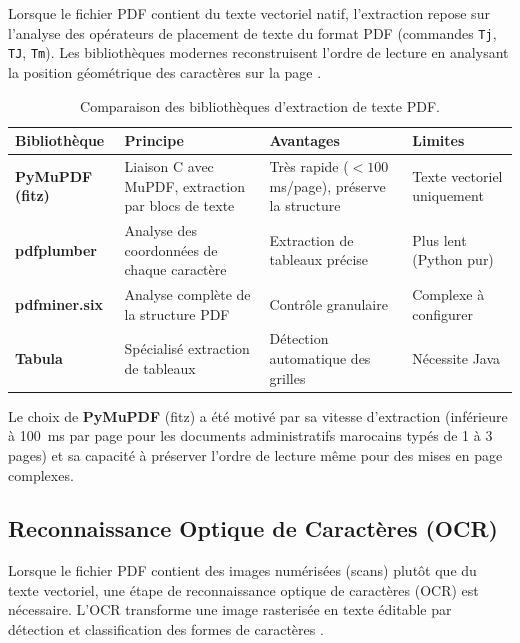 Lorsque le fichier PDF contient du texte vectoriel natif, l'extraction repose sur l'analyse des op\'{e}rateurs de placement de texte du format PDF (commandes \texttt{Tj}, \texttt{TJ}, \texttt{Tm}). Les biblioth\`{e}ques modernes reconstruisent l'ordre de lecture en analysant la position g\'{e}om\'{e}trique des caract\`{e}res sur la page \cite{pymupdf-doc}.

\begin{table}[H]
\centering
\small
\begin{tabularx}{\textwidth}{@{}>{\bfseries}p{3cm} Y Y Y@{}}
\toprule
{}
Biblioth\`{e}que & Principe & Avantages & Limites \\
\midrule
PyMuPDF (fitz) & Liaison C avec MuPDF, extraction par blocs de texte & Tr\`{e}s rapide ($<100$ms/page), pr\'{e}serve la structure & Texte vectoriel uniquement \\
pdfplumber & Analyse des coordonn\'{e}es de chaque caract\`{e}re & Extraction de tableaux pr\'{e}cise & Plus lent (Python pur) \\
pdfminer.six & Analyse compl\`{e}te de la structure PDF & Contr\^{o}le granulaire & Complexe \`{a} configurer \\
Tabula & Sp\'{e}cialis\'{e} extraction de tableaux & D\'{e}tection automatique des grilles & N\'{e}cessite Java \\
\bottomrule
\end{tabularx}
\caption{Comparaison des biblioth\`{e}ques d'extraction de texte PDF.}
\label{tab:pdf-extraction}
\end{table}

Le choix de \textbf{PyMuPDF} (fitz) a \'{e}t\'{e} motiv\'{e} par sa vitesse d'extraction (inf\'{e}rieure \`{a} 100~ms par page pour les documents administratifs marocains typ\'{e}s de 1 \`{a} 3 pages) et sa capacit\'{e} \`{a} pr\'{e}server l'ordre de lecture m\^{e}me pour des mises en page complexes.

\subsection{Reconnaissance Optique de Caract\`{e}res (OCR)}

Lorsque le fichier PDF contient des images num\'{e}ris\'{e}es (scans) plut\^{o}t que du texte vectoriel, une \'{e}tape de reconnaissance optique de caract\`{e}res (OCR) est n\'{e}cessaire. L'OCR transforme une image rasteris\'{e}e en texte \'{e}ditable par d\'{e}tection et classification des formes de caract\`{e}res \cite{tesseract-doc}.

